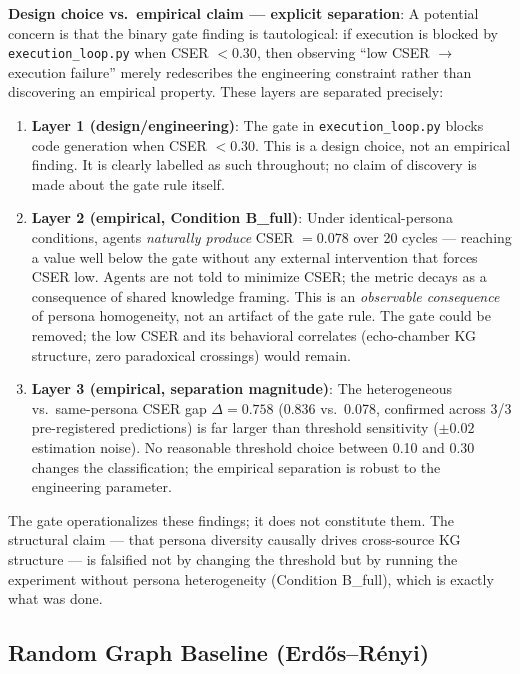 \documentclass[12pt]{article}
\begin{document}
\noindent\textbf{Design choice vs.\ empirical claim --- explicit separation}:
A potential concern is that the binary gate finding is tautological: if
execution is blocked by \texttt{execution\_loop.py} when CSER $< 0.30$,
then observing ``low CSER $\to$ execution failure'' merely redescribes the
engineering constraint rather than discovering an empirical property.
These layers are separated precisely:

\begin{enumerate}
  \item \textbf{Layer 1 (design/engineering)}: The gate in
        \texttt{execution\_loop.py} blocks code generation when CSER $< 0.30$.
        This is a design choice, not an empirical finding. It is clearly labelled
        as such throughout; no claim of discovery is made about the gate rule itself.

  \item \textbf{Layer 2 (empirical, Condition B\_full)}: Under identical-persona
        conditions, agents \emph{naturally produce} CSER $= 0.078$ over 20 cycles
        --- reaching a value well below the gate without any external intervention
        that forces CSER low. Agents are not told to minimize CSER; the metric
        decays as a consequence of shared knowledge framing. This is an
        \emph{observable consequence} of persona homogeneity, not an artifact of
        the gate rule. The gate could be removed; the low CSER and its behavioral
        correlates (echo-chamber KG structure, zero paradoxical crossings) would
        remain.

  \item \textbf{Layer 3 (empirical, separation magnitude)}: The heterogeneous
        vs.\ same-persona CSER gap $\Delta = 0.758$ (0.836 vs.\ 0.078,
        confirmed across 3/3 pre-registered predictions) is far larger than
        threshold sensitivity ($\pm 0.02$ estimation noise). No reasonable
        threshold choice between 0.10 and 0.30 changes the classification; the
        empirical separation is robust to the engineering parameter.
\end{enumerate}

\noindent The gate operationalizes these findings; it does not constitute them.
The structural claim --- that persona diversity causally drives cross-source
KG structure --- is falsified not by changing the threshold but by running
the experiment without persona heterogeneity (Condition B\_full), which is
exactly what was done.

\subsection{Random Graph Baseline (Erdős–Rényi)}
\end{document}
